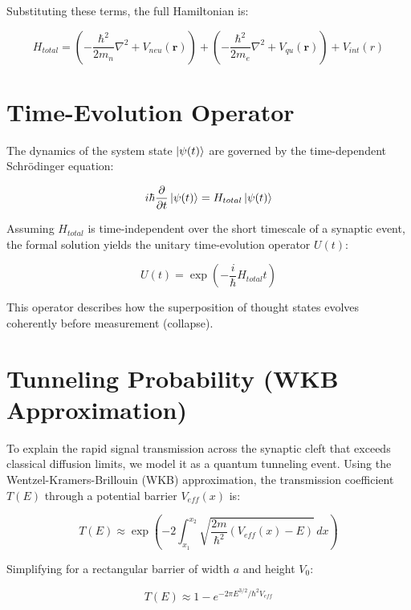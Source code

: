 \documentclass{article}
\begin{document}
Substituting these terms, the full Hamiltonian is:

\begin{equation}
    H_{total} = \left( -\frac{\hbar^2}{2m_n}\nabla^2 + V_{neu}(\mathbf{r}) \right) + \left( -\frac{\hbar^2}{2m_e}\nabla^2 + V_{qu}(\mathbf{r}) \right) + V_{int}(r)
\end{equation}

\section{Time-Evolution Operator}

The dynamics of the system state $\ket{\psi(t)}$ are governed by the time-dependent Schrödinger equation:

\begin{equation}
    i\hbar \frac{\partial}{\partial t}\ket{\psi(t)} = H_{total} \ket{\psi(t)}
\end{equation}

Assuming $H_{total}$ is time-independent over the short timescale of a synaptic event, the formal solution yields the unitary time-evolution operator $U(t)$:

\begin{equation}
    U(t) = \exp\left(-\frac{i}{\hbar} H_{total} t\right)
\end{equation}

This operator describes how the superposition of thought states evolves coherently before measurement (collapse).

\section{Tunneling Probability (WKB Approximation)}

To explain the rapid signal transmission across the synaptic cleft that exceeds classical diffusion limits, we model it as a quantum tunneling event. Using the Wentzel-Kramers-Brillouin (WKB) approximation, the transmission coefficient $T(E)$ through a potential barrier $V_{eff}(x)$ is:

\begin{equation}
    T(E) \approx \exp\left( -2 \int_{x_1}^{x_2} \sqrt{\frac{2m}{\hbar^2} (V_{eff}(x) - E)} \, dx \right)
\end{equation}

Simplifying for a rectangular barrier of width $a$ and height $V_0$:

\begin{equation}
    T(E) \approx 1 - e^{-2\pi E^{3/2}/\hbar^2 V_{eff}}
\end{equation}
\end{document}
